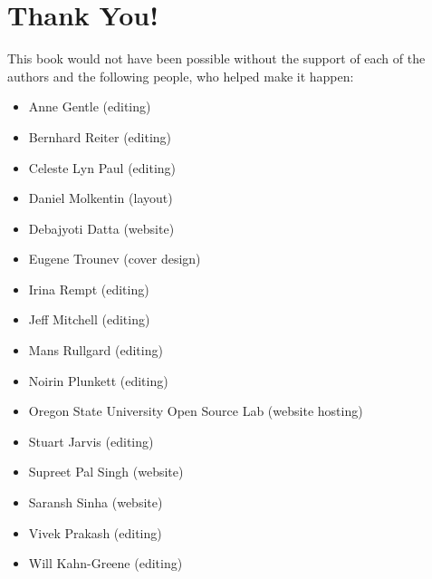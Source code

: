 \section*{Thank You!}

This book would not have been possible without the support of each of the
authors and the following people, who helped make it happen:
\begin{itemize}
 \item Anne Gentle (editing)
 \item Bernhard Reiter (editing)
 \item Celeste Lyn Paul (editing)
 \item Daniel Molkentin (layout)
 \item Debajyoti Datta (website)
 \item Eugene Trounev (cover design)
 \item Irina Rempt (editing)
 \item Jeff Mitchell (editing)
 \item Mans Rullgard (editing)
 \item Noirin Plunkett (editing)
 \item Oregon State University Open Source Lab (website hosting)
 \item Stuart Jarvis (editing)
 \item Supreet Pal Singh (website)
 \item Saransh Sinha (website)
 \item Vivek Prakash (editing)
 \item Will Kahn-Greene (editing)
\end{itemize}

\newpage
